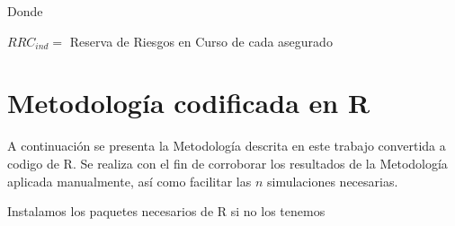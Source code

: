 \documentclass[11pt,twoside,openright,spanish]{report}
\numberwithin{equation}{chapter}
\numberwithin{figure}{chapter}
\numberwithin{table}{chapter}
\begin{document}
$ $

 
	
	Donde
	
	 
	
		
	
	$RRC_{ind}^{}=$ Reserva de Riesgos en Curso de cada asegurado
	


 

\clearpage
\appendix 

\fancyhead[LO]{}
\fancyhead[RE]{}
\pagestyle{fancy}

\chapter{Metodología codificada en R }\label{desarrolloconstadm}

A continuación se presenta la Metodología descrita en este trabajo convertida a codigo de R. Se realiza con el fin de corroborar los resultados de la Metodología aplicada manualmente, así como facilitar las $n$ simulaciones necesarias.


Instalamos los paquetes necesarios de R si no los tenemos
\end{document}
